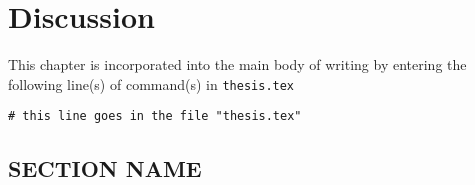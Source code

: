 \chapter{Discussion}
This chapter is incorporated into the main body of writing by entering the following line(s) of command(s) in \texttt{thesis.tex}
\begin{verbatim}
# this line goes in the file "thesis.tex"

\end{verbatim}

\section{SECTION NAME}



